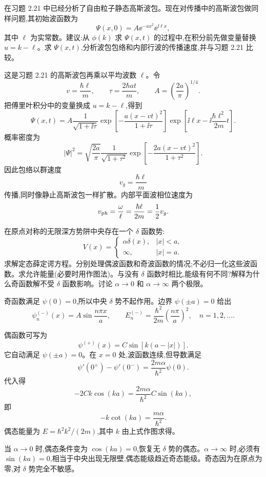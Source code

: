 \begin{question}
在习题 2.21 中已经分析了自由粒子静态高斯波包。现在对传播中的高斯波包做同样问题,其初始波函数为
\[
\Psi(x,0)=A\ee^{-ax^2}\ee^{\ii\ell x},
\]
其中 $\ell$ 为实常数。建议:从 $\phi(k)$ 求 $\Psi(x,t)$ 的过程中,在积分前先做变量替换 $u=k-\ell$。求 $\Psi(x,t)$,分析波包包络和内部行波的传播速度,并与习题 2.21 比较。
\begin{solution}
这是习题 2.21 的高斯波包再乘以平均波数 $\ell$。令
\[
v=\frac{\hbar\ell}{m},
\qquad
\tau=\frac{2\hbar at}{m},
\qquad
A=\left(\frac{2a}{\pi}\right)^{1/4}.
\]
把傅里叶积分中的变量换成 $u=k-\ell$,得到
\[
\Psi(x,t)=A\frac1{\sqrt{1+\ii\tau}}
\exp\left[-\frac{a(x-vt)^2}{1+\ii\tau}\right]
\exp\left[\ii\ell x-\ii\frac{\hbar\ell^2}{2m}t\right].
\]
概率密度为
\[
|\Psi|^2=\sqrt{\frac{2a}{\pi}}\frac1{\sqrt{1+\tau^2}}
\exp\left[-\frac{2a(x-vt)^2}{1+\tau^2}\right].
\]
因此包络以群速度
\[
v_g=\frac{\hbar\ell}{m}
\]
传播,同时像静止高斯波包一样扩散。内部平面波相位速度为
\[
v_{\rm ph}=\frac{\omega}{\ell}=\frac{\hbar\ell}{2m}=\frac12v_g.
\]
\end{solution}
\end{question}

\begin{question}
在原点对称的无限深方势阱中央存在一个 $\delta$ 函数势:
\[
V(x)=\begin{cases}\alpha\delta(x),& |x|<a,\\ \infty,& |x|=a.
\end{cases}
\]
求解定态薛定谔方程。分别处理偶波函数和奇波函数的情况;不必归一化这些波函数。求允许能量(必要时用作图法)。与没有 $\delta$ 函数时相比,能级有何不同?解释为什么奇函数解不受 $\delta$ 函数影响。讨论 $\alpha\to0$ 和 $\alpha\to\infty$ 两个极限。
\begin{solution}
奇函数满足 $\psi(0)=0$,所以中央 $\delta$ 势不起作用。边界 $\psi(\pm a)=0$ 给出
\[
\psi_n^{(-)}(x)=A\sin\frac{n\pi x}{a},
\qquad
E_n^{(-)}=\frac{\hbar^2}{2m}\left(\frac{n\pi}{a}\right)^2,
\quad n=1,2,\ldots.
\]

偶函数可写为
\[
\psi^{(+)}(x)=C\sin[k(a-|x|)].
\]
它自动满足 $\psi(\pm a)=0$。在 $x=0$ 处,波函数连续,但导数满足
\[
\psi'(0^+)-\psi'(0^-)=\frac{2m\alpha}{\hbar^2}\psi(0).
\]
代入得
\[
-2Ck\cos(ka)=\frac{2m\alpha}{\hbar^2}C\sin(ka),
\]
即
\[
-k\cot(ka)=\frac{m\alpha}{\hbar^2}.
\]
偶态能量为 $E=\hbar^2k^2/(2m)$,其中 $k$ 由上式作图求得。

当 $\alpha\to0$ 时,偶态条件变为 $\cos(ka)=0$,恢复无 $\delta$ 势的偶态。$\alpha\to\infty$ 时,必须有 $\sin(ka)=0$,相当于中央出现无限壁,偶态能级趋近奇态能级。奇态因为在原点为零,对 $\delta$ 势完全不敏感。
\end{solution}
\end{question}

